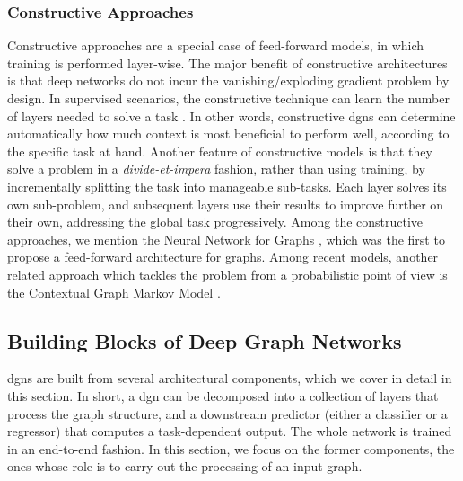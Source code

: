 \subsubsection*{Constructive Approaches}
Constructive approaches are a special case of feed-forward models, in which training is performed layer-wise. The major benefit of constructive architectures is that deep networks do not incur the vanishing/exploding gradient problem by design. In supervised scenarios, the constructive technique can learn the number of layers needed to solve a task \citep{fahlman1990cascor,marquez2018deepcascade,bianucci2000cascorchemistry}. In other words, constructive \glspl{dgn} can determine automatically how much context is most beneficial to perform well, according to the specific task at hand. Another feature of constructive models is that they solve a problem in a \emph{divide-et-impera} fashion, rather than using  training, by incrementally splitting the task into manageable sub-tasks. Each layer solves its own sub-problem, and subsequent layers use their results to improve further on their own, addressing the global task progressively. Among the constructive approaches, we mention the Neural Network for Graphs \citep{micheli2009nn4g}, which was the first to propose a feed-forward architecture for graphs. Among recent models, another related approach which tackles the problem from a probabilistic point of view is the Contextual Graph Markov Model \citep{bacciu2018contgraphmarkov}.

\subsection{Building Blocks of Deep Graph Networks}
\glspl{dgn} are built from several architectural components, which we cover in detail in this section. In short, a \gls{dgn} can be decomposed into a collection of layers that process the graph structure, and a downstream predictor (either a classifier or a regressor) that computes a task-dependent output. The whole network is trained in an end-to-end fashion. In this section, we focus on the former components, the ones whose role is to carry out the processing of an input graph.


